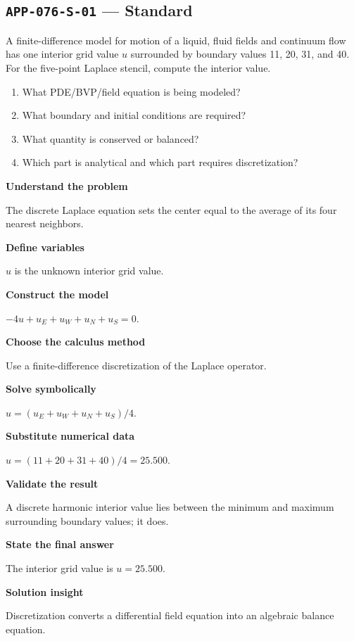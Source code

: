\documentclass[11pt]{book}
\newcommand{\pid}[1]{\texttt{#1}}
\begin{document}
\subsection*{\pid{APP-076-S-01} — Standard}
\begin{problembox}
A finite-difference model for motion of a liquid, fluid fields and continuum flow has one interior grid value $u$ surrounded by boundary values 11, 20, 31, and 40. For the five-point Laplace stencil, compute the interior value.
\end{problembox}
\begin{promptbox}\begin{enumerate}
\item What PDE/BVP/field equation is being modeled?
\item What boundary and initial conditions are required?
\item What quantity is conserved or balanced?
\item Which part is analytical and which part requires discretization?
\end{enumerate}\end{promptbox}
\begin{solutionbox}
\textbf{Understand the problem}\par The discrete Laplace equation sets the center equal to the average of its four nearest neighbors.\par\medskip
\textbf{Define variables}\par $u$ is the unknown interior grid value.\par\medskip
\textbf{Construct the model}\par $-4u+u_E+u_W+u_N+u_S=0$.\par\medskip
\textbf{Choose the calculus method}\par Use a finite-difference discretization of the Laplace operator.\par\medskip
\textbf{Solve symbolically}\par $u=(u_E+u_W+u_N+u_S)/4$.\par\medskip
\textbf{Substitute numerical data}\par $u=(11+20+31+40)/4=25.500$.\par\medskip
\textbf{Validate the result}\par A discrete harmonic interior value lies between the minimum and maximum surrounding boundary values; it does.\par\medskip
\textbf{State the final answer}\par The interior grid value is $u=25.500$.\par\medskip
\textbf{Solution insight}\par Discretization converts a differential field equation into an algebraic balance equation.\par\medskip
\end{solutionbox}
\end{document}
